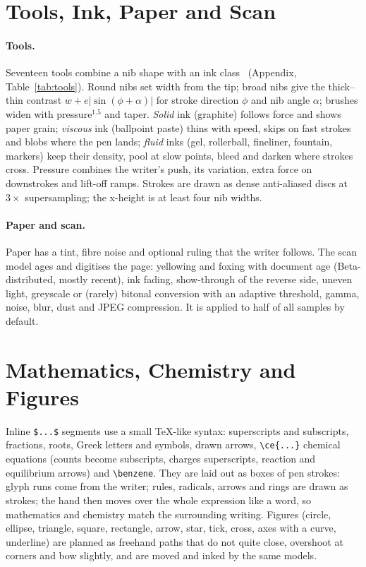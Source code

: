 \documentclass[10pt,twocolumn]{article}
\begin{document}
\section{Tools, Ink, Paper and Scan}
\label{sec:tool}

\paragraph{Tools.} Seventeen tools combine a nib shape with an ink class~\cite{franke2004} (Appendix,
Table~\ref{tab:tools}). Round nibs set width from the tip; broad nibs give the thick--thin contrast
$w+e\lvert\sin(\phi+\alpha)\rvert$ for stroke direction $\phi$ and nib angle $\alpha$; brushes widen with
pressure$^{1.5}$ and taper. \emph{Solid} ink (graphite) follows force and shows paper grain; \emph{viscous} ink
(ballpoint paste) thins with speed, skips on fast strokes and blobs where the pen lands; \emph{fluid} inks (gel,
rollerball, fineliner, fountain, markers) keep their density, pool at slow points, bleed and darken where strokes
cross. Pressure combines the writer's push, its variation, extra force on downstrokes and lift-off ramps. Strokes
are drawn as dense anti-aliased discs at $3\times$ supersampling; the x-height is at least four nib widths.

\paragraph{Paper and scan.} Paper has a tint, fibre noise and optional ruling that the writer follows. The scan
model ages and digitises the page: yellowing and foxing with document age (Beta-distributed, mostly recent), ink
fading, show-through of the reverse side, uneven light, greyscale or (rarely) bitonal conversion with an adaptive
threshold, gamma, noise, blur, dust and JPEG compression. It is applied to half of all samples by default.

\section{Mathematics, Chemistry and Figures}
\label{sec:math}

Inline \verb|$...$| segments use a small TeX-like syntax: superscripts and subscripts, fractions, roots, Greek
letters and symbols, drawn arrows, \verb|\ce{...}| chemical equations (counts become subscripts, charges
superscripts, reaction and equilibrium arrows) and \verb|\benzene|. They are laid out as boxes of pen strokes: glyph
runs come from the writer; rules, radicals, arrows and rings are drawn as strokes; the hand then moves over the
whole expression like a word, so mathematics and chemistry match the surrounding writing. Figures (circle,
ellipse, triangle, square, rectangle, arrow, star, tick, cross, axes with a curve, underline) are planned as
freehand paths that do not quite close, overshoot at corners and bow slightly, and are moved and inked by the
same models.
\end{document}
